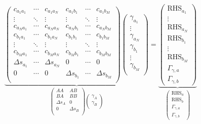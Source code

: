 	\begin{equation}
	\underbrace{\begin{pmatrix}
		c_{a_1a_1} & \cdots & c_{a_1a_N} & c_{a_1b_1} &\cdots & c_{a_1b_M}\\
		\vdots & \ddots & \vdots & \vdots &\ddots & \vdots\\
		c_{a_Na_1} & \cdots & c_{a_Na_N} & c_{a_Nb_1} &\cdots & c_{a_Nb_M}\\
		c_{b_1a_1} & \cdots & c_{b_1a_N} & c_{b_1b_1} &\cdots & c_{b_1b_M}\\
		\vdots & \ddots & \vdots & \vdots &\ddots & \vdots\\
		c_{b_Ma_1} & \cdots & c_{b_Ma_N} & c_{b_Mb_1} &\cdots & c_{b_Mb_M}\\
		\Delta s_{a_1} & \cdots & \Delta s_{a_N} & 0 & \cdots & 0\\
		0 & \cdots & 0 & \Delta s_{b_1} & \cdots & \Delta s_{b_M}\\
	\end{pmatrix}
	\begin{pmatrix}
		\gamma_{a_1}\\
		\vdots\\
		\gamma_{a_N}\\
		\gamma_{b_1}\\
		\vdots\\
		\gamma_{b_M}\\
	\end{pmatrix}}_{\begin{pmatrix}
						AA & AB \\
						BA & BB \\
						\Delta s_A & 0\\
						0 & \Delta s_B \\
					\end{pmatrix} \begin{pmatrix}
								\gamma_{A}\\
								\gamma_{B}\\
							\end{pmatrix}} 
	= 
	\underbrace{\begin{pmatrix}
		\mathrm{RHS}_{a_1}\\
		\vdots\\
		\mathrm{RHS}_{a_N}\\
		\mathrm{RHS}_{b_1}\\
		\vdots\\
		\mathrm{RHS}_{b_M}\\
		\Gamma_{\gamma,a}\\	
	\Gamma_{\gamma,b}
	\end{pmatrix}}_{ 
			\begin{pmatrix}
				\mathrm{RHS}_{a}\\
				\mathrm{RHS}_{b}\\
				\Gamma_{\gamma,a}\\	
				\Gamma_{\gamma,b}
			\end{pmatrix}}
	\end{equation}

